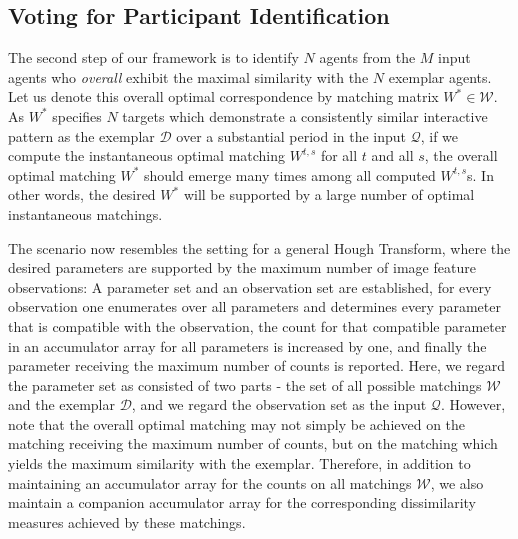 \subsection{Voting for Participant Identification}
\label{vote}
\vspace{-5pt}
The second step of our framework is to identify $N$ agents from the $M$ input agents who \emph{overall} exhibit the maximal similarity with the $N$ exemplar agents. Let us denote this overall optimal correspondence by matching matrix $W^{*}\in\mathcal{W}$.  As $W^{*}$ specifies $N$ targets which demonstrate a consistently similar interactive pattern as the exemplar $\mathcal{D}$ over a substantial period in the input $\mathcal{Q}$, if we compute the instantaneous optimal matching $W^{t,s}$ for all $t$ and all $s$, the overall optimal matching $W^{*}$ should emerge many times among all computed $W^{t,s}$s. In other words, the desired $W^{*}$ will be supported by a large number of optimal instantaneous matchings. 

The scenario now resembles the setting for a general Hough Transform, where the desired parameters are supported by the maximum number of image feature observations: A parameter set and an observation set are established, for every observation one enumerates over all parameters and determines every parameter that is compatible with the observation, the count for that compatible parameter in an accumulator array for all parameters is increased by one, and finally the parameter receiving the maximum number of counts is reported. Here, we regard the parameter set as consisted of two parts - the set of all possible matchings $\mathcal{W}$ and the exemplar $\mathcal{D}$, and we regard the observation set as the input $\mathcal{Q}$. However, note that the overall optimal matching may not simply be achieved on the matching receiving the maximum number of counts, but on the matching which yields the maximum similarity with the exemplar. Therefore, in addition to maintaining an accumulator array for the counts on all matchings $\mathcal{W}$, we also maintain a companion accumulator array for the corresponding dissimilarity measures achieved by these matchings. 

